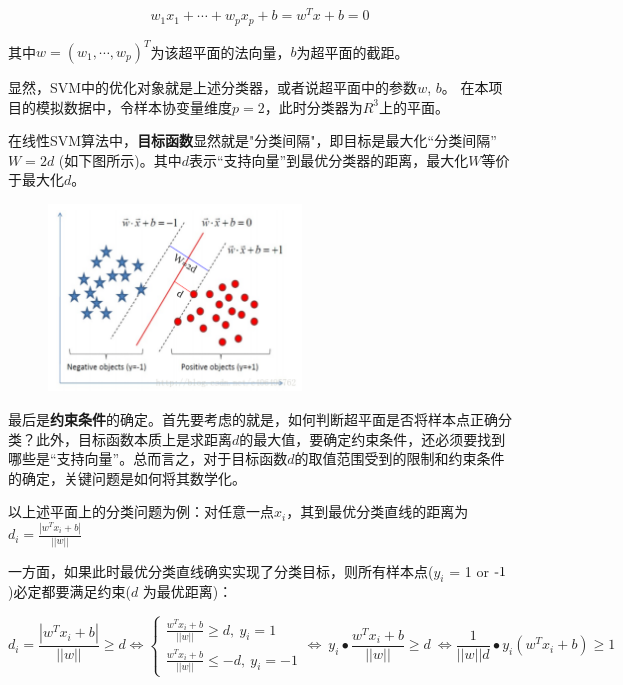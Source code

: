 \documentclass[12pt]{article}  %
\begin{document}
\begin{equation}
	w_1x_1+\cdots+w_px_p+b=w^Tx+b=0
\end{equation}

其中$w={(w_1,\cdots,w_p)}^T$为该超平面的法向量，$b$为超平面的截距。

显然，SVM中的优化对象就是上述分类器，或者说超平面中的参数$w$, $b$。
在本项目的模拟数据中，令样本协变量维度$p=2$，此时分类器为$R^3$上的平面。

在线性SVM算法中，\textbf{目标函数}显然就是"分类间隔"，即目标是最大化“分类间隔”$W=2d$ (如下图所示)。其中$d$表示“支持向量”到最优分类器的距离，最大化$W$等价于最大化$d$。

\begin{figure}[H]
	\centering
	\includegraphics[width=0.6\textwidth]{4.png}
\end{figure}

最后是\textbf{约束条件}的确定。首先要考虑的就是，如何判断超平面是否将样本点正确分类？此外，目标函数本质上是求距离$d$的最大值，要确定约束条件，还必须要找到哪些是“支持向量”。总而言之，对于目标函数$d$的取值范围受到的限制和约束条件的确定，关键问题是如何将其数学化。

以上述平面上的分类问题为例：对任意一点$x_i$，其到最优分类直线的距离为$d_i=\frac{|w^Tx_i+b|}{||w||}$

一方面，如果此时最优分类直线确实实现了分类目标，则所有样本点($y_i$ = 1 or $\textnormal{-}1$)必定都要满足约束($d$ 为最优距离)：

\begin{equation}
	d_i=\frac{|w^Tx_i+b|}{||w||}\geq d \Leftrightarrow 
	\begin{cases}
		\frac{w^Tx_i+b}{||w||}\geq d,\ y_i=1\ \\
		\frac{w^Tx_i+b}{||w||}\le-d,\ y_i=-1
	\end{cases}
	\Leftrightarrow \ y_i\bullet\frac{w^Tx_i+b}{||w||}\geq d\ 
	\Leftrightarrow \frac{1}{||w||d}\bullet y_i(w^Tx_i+b)\geq1
\end{equation}
\end{document}
